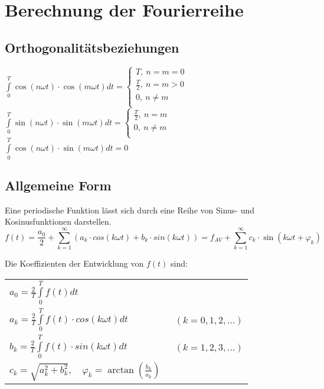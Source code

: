 \section{Berechnung der Fourierreihe}
\subsection{Orthogonalitätsbeziehungen}

            $\int\limits_0^T \cos(n\omega t)\cdot \cos(m\omega t)dt=
            \begin{cases}
            T,\ n=m=0\\
            \frac{T}{2},\ n=m>0\\ 
            0,\ n\neq m\\
            \end{cases}$\\
            
            
           $\int\limits_0^T \sin(n\omega t)\cdot \sin(m\omega t)dt=
           \begin{cases}
           \frac{T}{2},\ n=m\\
           0,\ n\neq m\\
           \end{cases}$\\
           $\int\limits_0^T \cos(n\omega t)\cdot \sin(m\omega t)dt=0$
           
\subsection{Allgemeine Form}
Eine periodische Funktion lässt sich durch eine Reihe von Sinus- und Kosinusfunktionen darstellen.
$$f(t) = \frac{a_{0}}{2}+\sum_{k = 1}^{\infty} (a_{k} \cdot cos(k \omega t)+ b_{k} \cdot sin(k \omega t)) = f_{AV} + \sum_{k = 1}^{\infty} c_k \cdot \sin(k\omega t + \varphi_k)$$

Die Koeffizienten der Entwicklung von $f(t)$ sind:

\begin{tabular}{ll}
  $a_{0} = \frac{2}{T}\int\limits_{0}^{T}f(t)dt$ & \\
  $a_{k} = \frac{2}{T}\int\limits_{0}^{T}f(t) \cdot cos(k \omega t)dt$   &\ $(k = 0,1,2,...)$\\
  $b_{k} = \frac{2}{T}\int\limits_{0}^{T}f(t) \cdot sin(k \omega t)dt$   &\ $(k = 1,2,3,...)$\\
  $c_{k} = \sqrt{a_k^2 + b_k^2},\quad \varphi_k = \arctan(\frac{b_k}{a_k})$
\end{tabular}

